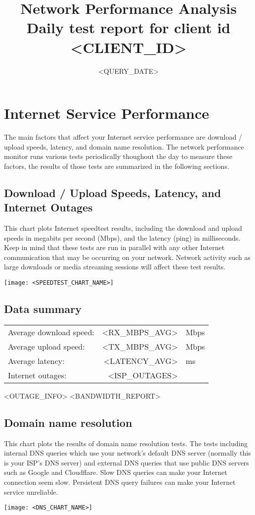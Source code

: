 \documentclass[11pt]{article}
\title{\vspace{-0.5in}\huge{Network Performance Analysis\\\large Daily test report for client id <CLIENT_ID>}\vspace{-0.5in}
}
\begin{document}
\setlength{\parindent}{0pt}
\date{<QUERY_DATE>}
\maketitle
\section{Internet Service Performance}
The main factors that affect your Internet service performance are download / upload speeds, latency, and domain name resolution. The network performance monitor runs various tests periodically thoughout the day to measure these factors, the results of those tests are summarized in the following sections.
\subsection{Download / Upload Speeds, Latency, and Internet Outages}
This chart plots Internet speedtest results, including the download and upload speeds in megabits per second (Mbps), and the latency (ping) in milliseconds. Keep in mind that these tests are run in parallel with any other Internet communication that may be occurring on your network. Network activity such as large downloads or media streaming sessions will affect these test results. 
\begin{center}
\texttt{[image: <SPEEDTEST\_CHART\_NAME>]}
\end{center}
\subsection{Data summary}
\begin{tabular}{@{}l@{\hskip 0.1in}r@{\hskip 0.025in}l@{}} 
Average download speed: & <RX_MBPS_AVG> & Mbps \\
Average upload speed: & <TX_MBPS_AVG> & Mbps \\
Average latency: & <LATENCY_AVG> & ms \\
Internet outages: & <ISP_OUTAGES> & \\
\end{tabular}

\medskip

<OUTAGE_INFO>
<BANDWIDTH_REPORT>

\subsection{Domain name resolution}
This chart plots the results of domain name resolution tests. The tests including internal DNS queries which use your network's default DNS server (normally this is your ISP's DNS server) and external DNS queries that use public DNS servers such as Google and Cloudflare. Slow DNS queries can make your Internet connection seem slow. Persistent DNS query failures can make your Internet service unreliable.
\begin{center}
\texttt{[image: <DNS\_CHART\_NAME>]}
\end{center}
\end{document}
